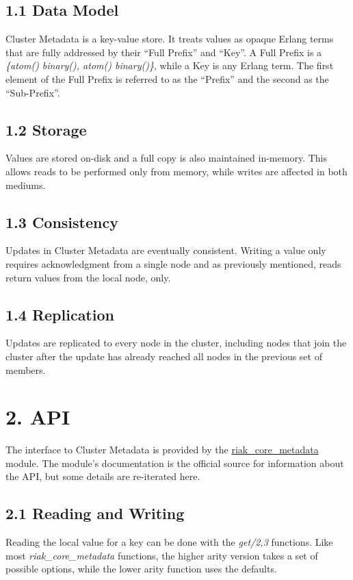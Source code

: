 \documentclass[letterpaper,10pt,english]{sphinxmanual}
\begin{document}
\subsection{1.1 Data Model}
\label{riak_core_metadata:data-model}
Cluster Metadata is a key-value store. It treats values as opaque
Erlang terms that are fully addressed by their ``Full Prefix'' and
``Key''. A Full Prefix is a \emph{\{atom() \textbar{} binary(), atom() \textbar{} binary()\}},
while a Key is any Erlang term. The first element of the Full Prefix
is referred to as the ``Prefix'' and the second as the ``Sub-Prefix''.


\subsection{1.2 Storage}
\label{riak_core_metadata:storage}
Values are stored on-disk and a full copy is also maintained
in-memory. This allows reads to be performed only from memory, while
writes are affected in both mediums.


\subsection{1.3 Consistency}
\label{riak_core_metadata:consistency}
Updates in Cluster Metadata are eventually consistent. Writing a value
only requires acknowledgment from a single node and as previously
mentioned, reads return values from the local node, only.


\subsection{1.4 Replication}
\label{riak_core_metadata:replication}
Updates are replicated to every node in the cluster, including nodes
that join the cluster after the update has already reached all nodes
in the previous set of members.


\section{2. API}
\label{riak_core_metadata:api}
The interface to Cluster Metadata is provided by the
\href{https://github.com/basho/riak\_core/blob/develop/src/riak\_core\_metadata.erl}{riak\_core\_metadata}
module. The module's documentation is the official source for
information about the API, but some details are re-iterated here.


\subsection{2.1 Reading and Writing}
\label{riak_core_metadata:reading-and-writing}
Reading the local value for a key can be done with the \emph{get/2,3}
functions. Like most \emph{riak\_core\_metadata} functions, the higher arity
version takes a set of possible options, while the lower arity
function uses the defaults.
\end{document}
